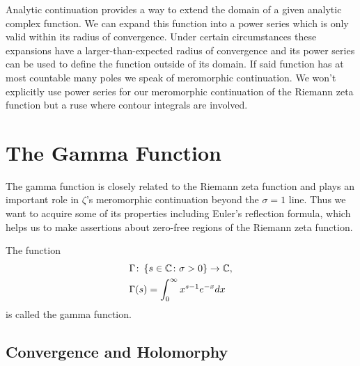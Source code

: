 Analytic continuation provides a way to extend the domain of a given analytic complex function. We can expand this function into a power series which is only valid within its radius of convergence. Under certain circumstances these expansions have a larger-than-expected radius of convergence and its power series can be used to define the function outside of its domain. If said function has at most countable many poles we speak of meromorphic continuation. We won't explicitly use power series  for our meromorphic continuation of the Riemann zeta function but a ruse where contour integrals are involved.


\section{The Gamma Function}
The gamma function is closely related to the Riemann zeta function and plays an important role in $\zeta$'s meromorphic continuation beyond the $\sigma = 1$ line. Thus we want to acquire some of its properties including Euler's reflection formula, which helps us to make assertions about zero-free regions of the Riemann zeta function.


\begin{definition}
	The function
\begin{equation*}
\begin{aligned}
	&\Gamma \colon \left\{s \in \mathbb{C} \colon \sigma > 0\right\} \to \mathbb{C}, \\
	&\Gamma(s) = \int _0 ^\infty x^{s - 1} e^{-x} dx
\end{aligned}
\end{equation*}
	is called the gamma function.
\end{definition}


\subsection{Convergence and Holomorphy}


